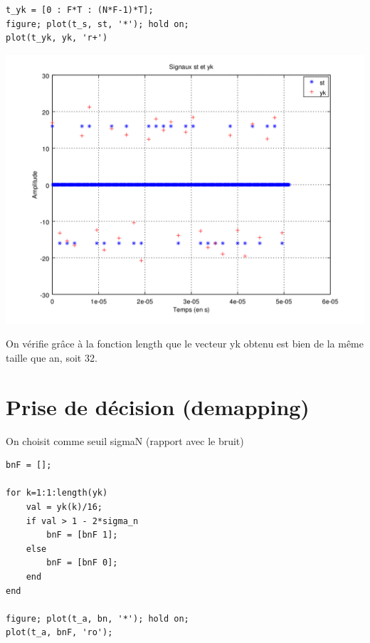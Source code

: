 \documentclass{acm_proc_article-sp}
\begin{document}
\begin{center}
\begin{center}
\begin{center}
\begin{lstlisting}
t_yk = [0 : F*T : (N*F-1)*T];
figure; plot(t_s, st, '*'); hold on;
plot(t_yk, yk, 'r+')
\end{lstlisting}

\includegraphics[scale=0.45]{yk_13.png}
\end{center}

On vérifie grâce à la fonction length que le vecteur yk obtenu est bien de la même taille que an, soit 32.


\section{Prise de décision (demapping)}

On choisit comme seuil sigmaN (rapport avec le bruit)

\begin{center}
\begin{lstlisting}
bnF = [];

for k=1:1:length(yk)
    val = yk(k)/16;
    if val > 1 - 2*sigma_n
        bnF = [bnF 1];
    else
        bnF = [bnF 0];
    end
end

figure; plot(t_a, bn, '*'); hold on;
plot(t_a, bnF, 'ro');
\end{lstlisting}


\end{center}
\end{center}
\end{center}
\end{document}

